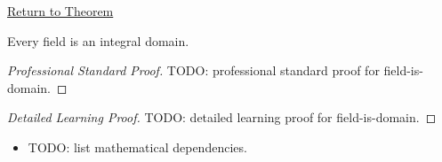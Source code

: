 \newpage
{}
\label{prf:field-is-domain}

\begin{remark*}[Return]
\hyperref[prop:field-is-domain]{Return to Theorem}
\end{remark*}

\begin{proposition*}
Every field is an integral domain.
\end{proposition*}

\begin{proof}[Professional Standard Proof]
\LRAProofBodyStart
TODO: professional standard proof for field-is-domain.
\end{proof}

\begin{proof}[Detailed Learning Proof]
\LRAProofBodyStart
TODO: detailed learning proof for field-is-domain.
\end{proof}

\begin{remark*}
\end{remark*}

\begin{dependencies}
\begin{itemize}
  \item TODO: list mathematical dependencies.
\end{itemize}
\end{dependencies}

\clearpage

